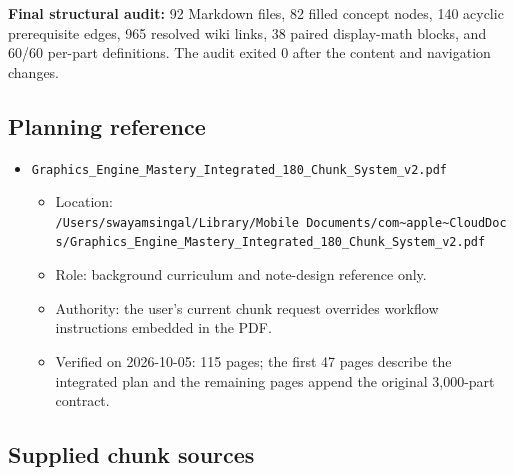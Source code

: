 \textbf{Final structural audit:} 92 Markdown files, 82 filled concept nodes, 140 acyclic prerequisite edges, 965 resolved wiki links, 38 paired display-math blocks, and 60/60 per-part definitions. The audit exited 0 after the content and navigation changes.

\subsection{Planning reference}\label{appendix-a103e7846d21-planning-reference}

\begin{itemize}
\tightlist
\item
  \texttt{Graphics\_Engine\_Mastery\_Integrated\_180\_Chunk\_System\_v2.pdf}

  \begin{itemize}
  \tightlist
  \item
    Location: \texttt{/Users/swayamsingal/Library/Mobile\ Documents/com\textasciitilde{}apple\textasciitilde{}CloudDocs/Graphics\_Engine\_Mastery\_Integrated\_180\_Chunk\_System\_v2.pdf}
  \item
    Role: background curriculum and note-design reference only.
  \item
    Authority: the user's current chunk request overrides workflow instructions embedded in the PDF.
  \item
    Verified on 2026-10-05: 115 pages; the first 47 pages describe the integrated plan and the remaining pages append the original 3,000-part contract.
  \end{itemize}
\end{itemize}

\subsection{Supplied chunk sources}\label{appendix-a103e7846d21-supplied-chunk-sources}

